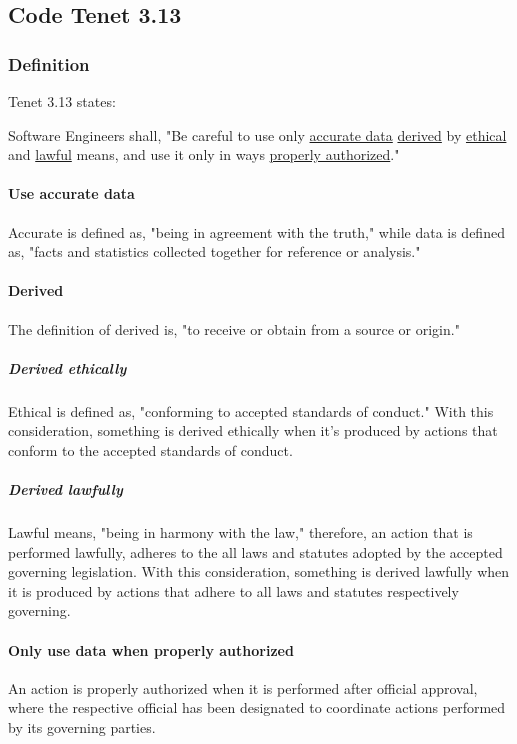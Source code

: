 \documentclass[12pt]{article}
\begin{document}
\begin{multicols}{2}
\subsection{Code Tenet 3.13}

\subsubsection{Definition}

Tenet 3.13  states:
\begin{framed}
Software Engineers shall, "Be careful to use only \ul{accurate data} \ul{derived} by \ul{ethical} and \ul{lawful} means, and use it only in ways \ul{properly authorized}."\cite{softwareEngineeringCodeOfEthics}
\end{framed}

\paragraph{Use accurate data}
Accurate is defined as, "being in agreement with the truth," while data is defined as, "facts and statistics collected together for reference or analysis."\cite{cambridgeDictionary}

\paragraph{Derived}
The definition of derived is, "to receive or obtain from a source or origin."\cite{softwareDefinition}

\subparagraph{Derived ethically}
Ethical is defined as, "conforming to accepted standards of conduct."\cite{cambridgeDictionary} With this consideration, something is derived ethically when it's produced by actions that conform to the accepted standards of conduct.

\subparagraph{Derived lawfully}
Lawful means, "being in harmony with the law," therefore, an action that is performed lawfully, adheres to the all laws and statutes adopted by the accepted governing legislation.\cite{cambridgeDictionary} With this consideration, something is derived lawfully when it is produced by actions that adhere to all laws and statutes respectively governing.

\paragraph{Only use data when properly authorized}
An action is properly authorized when it is performed after official approval, where the respective official has been designated to coordinate actions performed by its governing parties.


\end{multicols}
\end{document}
